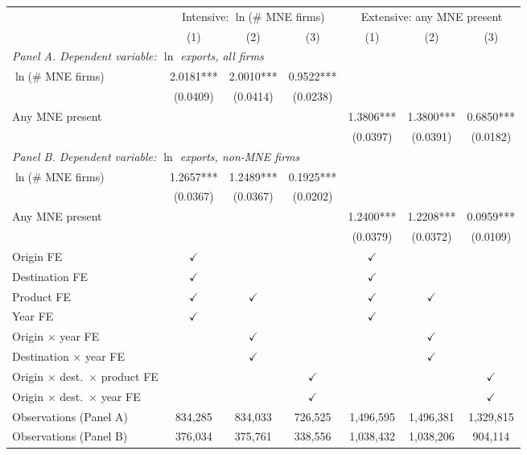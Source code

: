 \begin{tabular}{lcccccc} \hline
 & \multicolumn{3}{c}{Intensive: $\ln$(\# MNE firms)} & \multicolumn{3}{c}{Extensive: any MNE present} \\
 & (1) & (2) & (3) & (1) & (2) & (3) \\ \hline
\multicolumn{7}{l}{\textit{Panel A. Dependent variable: $\ln$ exports, all firms}} \\
$\ln$(\# MNE firms) & 2.0181*** & 2.0010*** & 0.9522*** &  &  &  \\
 & (0.0409) & (0.0414) & (0.0238) &  &  &  \\
Any MNE present &  &  &  & 1.3806*** & 1.3800*** & 0.6850*** \\
 &  &  &  & (0.0397) & (0.0391) & (0.0182) \\
\midrule
\multicolumn{7}{l}{\textit{Panel B. Dependent variable: $\ln$ exports, non-MNE firms}} \\
$\ln$(\# MNE firms) & 1.2657*** & 1.2489*** & 0.1925*** &  &  &  \\
 & (0.0367) & (0.0367) & (0.0202) &  &  &  \\
Any MNE present &  &  &  & 1.2400*** & 1.2208*** & 0.0959*** \\
 &  &  &  & (0.0379) & (0.0372) & (0.0109) \\
\hline
Origin FE & $\checkmark$ &  &  & $\checkmark$ &  &  \\
Destination FE & $\checkmark$ &  &  & $\checkmark$ &  &  \\
Product FE & $\checkmark$ & $\checkmark$ &  & $\checkmark$ & $\checkmark$ &  \\
Year FE & $\checkmark$ &  &  & $\checkmark$ &  &  \\
Origin $\times$ year FE &  & $\checkmark$ &  &  & $\checkmark$ &  \\
Destination $\times$ year FE &  & $\checkmark$ &  &  & $\checkmark$ &  \\
Origin $\times$ dest.\ $\times$ product FE &  &  & $\checkmark$ &  &  & $\checkmark$ \\
Origin $\times$ dest.\ $\times$ year FE &  &  & $\checkmark$ &  &  & $\checkmark$ \\
Observations (Panel A) & 834,285 & 834,033 & 726,525 & 1,496,595 & 1,496,381 & 1,329,815 \\
Observations (Panel B) & 376,034 & 375,761 & 338,556 & 1,038,432 & 1,038,206 & 904,114 \\
\hline
\end{tabular}
